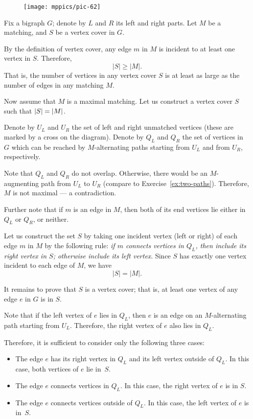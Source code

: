 \begin{wrapfigure}{o}{30 mm}
\vskip-5mm
\centering
\texttt{[image: mppics/pic-62]}
\vskip1mm
\end{wrapfigure}

Fix a bigraph $G$;
denote by $L$ and $R$ its left and right parts.
Let $M$ be a matching, and $S$ be a vertex cover in $G$.

By the definition of vertex cover, any edge $m$ in $M$ is incident to at least one vertex in $S$.
Therefore, 
\[|S|\ge |M|.\] 
That is, the number of vertices in any vertex cover $S$ is at least as large as the number of edges in any matching $M$.

Now assume that $M$ is a maximal matching.
Let us construct a vertex cover $S$ such that $|S|=|M|$.

Denote by $U_L$ and $U_R$ the set of left and right unmatched vertices (these are marked by a cross on the diagram).
Denote by $Q_L$ and $Q_R$ the set of vertices in $G$ which can be reached by $M$-alternating paths starting from $U_L$ and from $U_R$, respectively.

Note that $Q_L$ and $Q_R$ do not overlap.
Otherwise, there would be an $M$-augmenting path from $U_L$ to $U_R$ (compare to Exercise~\ref{ex:two-paths}).
Therefore, $M$ is not maximal --- a contradiction.

Further note that if $m$ is an edge in $M$, then both of its end vertices lie either in $Q_L$ or $Q_R$, or neither.

Let us construct the set $S$ by taking one incident vertex (left or right) of each edge $m$ in $M$ by the following rule:
\emph{if $m$ connects vertices in $Q_L$, then include its right vertex in $S$;
otherwise include its left vertex}.
Since $S$ has exactly one vertex incident to each edge of $M$, we have
\[|S|=|M|.\]

It remains to prove that $S$ is a vertex cover;
that is, at least one vertex of any edge $e$ in $G$ is in $S$.

Note that if the left vertex of $e$ lies in $Q_L$, then $e$ is an edge on an $M$-alternating path starting from $U_L$. 
Therefore, the right vertex of $e$ also lies in $Q_L$.

Therefore, it is sufficient to consider only the following three cases:
\begin{itemize}
\item The edge $e$ has
its right vertex in $Q_L$ and its left vertex outside of $Q_L$.
In this case, both vertices of $e$ lie in~$S$.
\item The edge $e$ connects vertices in $Q_L$.
In this case, the right vertex of $e$ is in $S$.
\item The edge $e$ connects vertices outside of $Q_L$. 
In this case, the left vertex of $e$ is in~$S$.
\qeds
\end{itemize}


